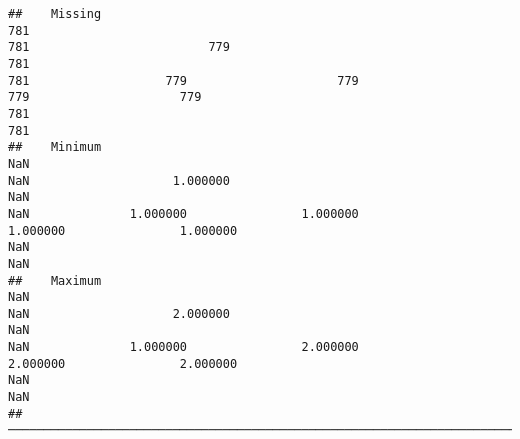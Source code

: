 \documentclass[
]{article}
\begin{document}
\begin{verbatim}
##    Missing                                                                  781                                                                  781                         779                                                                  781                                                                  781                   779                     779                     779                     779                                                                  781                                                                  781   
##    Minimum                                                                  NaN                                                                  NaN                    1.000000                                                                  NaN                                                                  NaN              1.000000                1.000000                1.000000                1.000000                                                                  NaN                                                                  NaN   
##    Maximum                                                                  NaN                                                                  NaN                    2.000000                                                                  NaN                                                                  NaN              1.000000                2.000000                2.000000                2.000000                                                                  NaN                                                                  NaN   
##  ───────────────────────────────────────────────────────────────────────────────────────────────────────────────────────────────────────────────────────────────────────────────────────────────────────────────────────────────────────────────────────────────────────────────────────────────────────────────────────────────────────────────────────────────────────────────────────────────────────────────────────────────────────────────────────────────────────────────────────────────────────────────────────────────────────────────────────────────────
\end{verbatim}
\end{document}
